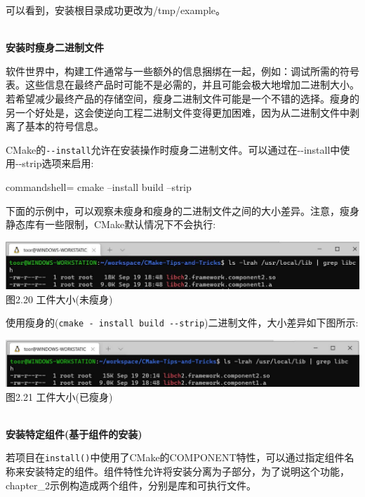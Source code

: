 可以看到，安装根目录成功更改为/tmp/example。

\hspace*{\fill} \\ %
\noindent
\textbf{安装时瘦身二进制文件}

软件世界中，构建工件通常与一些额外的信息捆绑在一起，例如：调试所需的符号表。这些信息在最终产品时可能不是必需的，并且可能会极大地增加二进制大小。若希望减少最终产品的存储空间，瘦身二进制文件可能是一个不错的选择。瘦身的另一个好处是，这会使逆向工程二进制文件变得更加困难，因为从二进制文件中剥离了基本的符号信息。

CMake的\texttt{-{}-install}允许在安装操作时瘦身二进制文件。可以通过在-{}-install中使用-{}-strip选项来启用:

\begin{tcblisting}{commandshell={}}
cmake --install build --strip
\end{tcblisting}

下面的示例中，可以观察未瘦身和瘦身的二进制文件之间的大小差异。注意，瘦身静态库有一些限制，CMake默认情况下不会执行:

\begin{center}
\includegraphics[width=1.\textwidth]{content/1/chapter2/images/20.jpg}\\
图2.20 工件大小(未瘦身)
\end{center}

使用瘦身的(\texttt{cmake - install build -{}-strip})二进制文件，大小差异如下图所示:

\begin{center}
\includegraphics[width=1.\textwidth]{content/1/chapter2/images/21.jpg}\\
图2.21 工件大小(已瘦身)
\end{center}

\hspace*{\fill} \\ %
\noindent
\textbf{安装特定组件(基于组件的安装)}

若项目在\texttt{install()}中使用了CMake的COMPONENT特性，可以通过指定组件名称来安装特定的组件。组件特性允许将安装分离为子部分，为了说明这个功能，chapter\_2示例构造成两个组件，分别是库和可执行文件。

